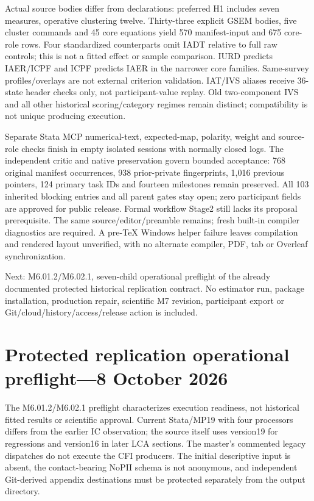 \documentclass[11pt,a4paper]{article}
\begin{document}
Actual source bodies differ from declarations: preferred H1 includes seven
measures, operative clustering twelve. Thirty-three explicit GSEM bodies,
five cluster commands and 45 core equations yield 570 manifest-input and
675 core-role rows. Four standardized counterparts omit IADT relative to
full raw controls; this is not a fitted effect or sample comparison.
IURD predicts IAER/ICPF and ICPF predicts IAER in the narrower core families.
Same-survey profiles/overlays are not external criterion validation.
IAT/IVS aliases receive 36-state header checks only, not participant-value
replay. Old two-component IVS and all other historical scoring/category
regimes remain distinct; compatibility is not unique producing execution.

Separate Stata MCP numerical-text, expected-map, polarity, weight and
source-role checks finish in empty isolated sessions with normally closed
logs. The independent critic and native preservation govern bounded
acceptance: 768 original manifest occurrences, 938 prior-private
fingerprints, 1,016 previous pointers, 124 primary task IDs and fourteen
milestones remain preserved. All 103 inherited blocking entries and all
parent gates stay open; zero participant fields are approved for public
release. Formal workflow Stage2 still lacks its proposal prerequisite.
The same source/editor/preamble remains; fresh built-in compiler diagnostics
are required. A pre-TeX Windows helper failure leaves compilation and
rendered layout unverified, with no alternate compiler, PDF, tab or
Overleaf synchronization.

Next: M6.01.2/M6.02.1, seven-child operational preflight of the already
documented protected historical replication contract. No estimator run,
package installation, production repair, scientific M7 revision,
participant export or Git/cloud/history/access/release action is included.

\section{Protected replication operational preflight---8 October 2026}
The M6.01.2/M6.02.1 preflight characterizes execution readiness, not
historical fitted results or scientific approval. Current Stata/MP19 with
four processors differs from the earlier IC observation; the source itself
uses version19 for regressions and version16 in later LCA sections. The
master's commented legacy dispatches do not execute the CFI producers.
The initial descriptive input is absent, the contact-bearing NoPII schema
is not anonymous, and independent Git-derived appendix destinations must
be protected separately from the output directory.
\end{document}
